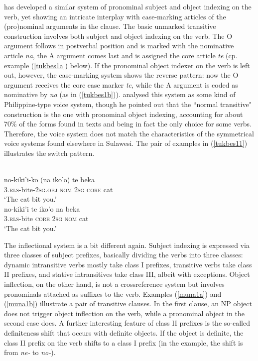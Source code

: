  has developed a similar system of pronominal subject and object indexing on the verb, yet showing an intricate interplay with case-marking articles of the (pro)nominal arguments in the clause. The basic unmarked transitive construction involves both subject and object indexing on the verb. The O argument follows in postverbal position and is marked with the nominative article \textit{na}, the A argument comes last and is assigned the core article \textit{te} (cp. example (\ref{tukbes1a}) below). If the pronominal object indexer on the verb is left out, however, the case-marking system shows the reverse pattern: now the O argument receives the core case marker \textit{te}, while the A argument is coded as nominative by \textit{na} (as in (\ref{tukbes1b})). \citet[53]{donohue1999} analysed this system as some kind of Philippine-type voice system, though he pointed out that the ``normal transitive" construction is the one with pronominal object indexing, accounting for about 70\% of the forms found in texts and being in fact the only choice for some verbs. Therefore, the  voice system does not match the characteristics of the symmetrical voice systems found elsewhere in Sulawesi. The pair of examples in (\ref{tukbes11}) illustrates the switch pattern.

\ea \label{tukbes11} 
\\
\ea \label{tukbes1a}
\gll no-kiki'i-ko (na iko'o) te beka \\
\textsc{3}.\textsc{rls}-bite-\textsc{2}\textsc{sg}.\textsc{obj} \textsc{nom} \textsc{2}\textsc{sg} \textsc{core} cat \\
\glft `The cat bit you.' \\ 
\ex \label{tukbes1b}
\gll no-kiki'i te iko'o na beka \\ 
\textsc{3}.\textsc{rls}-bite \textsc{core} \textsc{2}\textsc{sg} \textsc{nom} cat \\
\glft `The cat bit you.'\\ 
\z
\z

The  inflectional system is a bit different again. Subject indexing is expressed via three classes of subject prefixes, basically dividing the  verbs into three classes: dynamic intransitive verbs mostly take class I prefixes, transitive verbs take class II prefixes, and stative intransitives take class III, albeit with exceptions. Object inflection, on the other hand, is not a crossreference system but involves pronominals attached as suffixes to the verb. Examples (\ref{muna1a}) and (\ref{muna1b}) illustrate a pair of transitive clauses. In the first clause, an NP object does not trigger object inflection on the verb, while a pronominal object in the second case does. A further interesting feature of class II prefixes is the so-called definiteness shift that occurs with definite objects. If the object is definite, the class II prefix on the verb shifts to a class I prefix (in the example, the shift is from \textit{ne-} to \textit{no-}).

